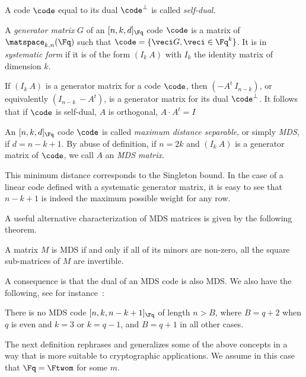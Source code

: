 A code $\code$ equal to its dual $\code^\bot$ is called \emph{self-dual}.


\begin{defi}
A \emph{generator matrix} $G$ of an $[n, k, d]_{\Fq}$ code $\code$ is a matrix of $\matspace_{k,n}(\Fq)$ such that
$\code = \{\veci G, \veci \in \Fq^k\}$. It is in \emph{systematic form} if it is of the form $(I_k~A)$ with
$I_k$ the identity matrix of dimension $k$.
\end{defi}

If $(I_k~A)$ is a generator matrix for a code $\code$, then $(-A^t~I_{n-k})$, or equivalently $(I_{n-k}~-A^t)$,
is a generator matrix for its dual $\code^\bot$. It follows that if $\code$ is self-dual, $A$ is orthogonal,
\ie $A\cdot A^t = I$

\begin{defi}
An $[n,k,d]_{\Fq}$ code $\code$ is called \emph{maximum distance separable}, or simply \emph{MDS}, if $d = n - k + 1$.
By abuse of definition, if $n = 2k$ and $(I_k~A)$ is a generator matrix of $\code$, we call $A$ an \emph{MDS matrix}.
\end{defi}

This minimum distance corresponds to the Singleton bound. In the case of a linear code 
defined with a
systematic generator matrix, it is easy to see that $n - k + 1$ is indeed the maximum possible weight for any row.

A useful alternative characterization of MDS matrices is given by the following theorem.

\begin{thm} 
\label{thm:mds_minors}
A matrix $M$ is MDS if and only if all of its minors are non-zero, \ie all the square sub-matrices of $M$ are invertible.
\end{thm}

A consequence is that the dual of an MDS code is also MDS.
We also have the following, see for instance~\cite[Chap. 1]{tvn}:

\begin{conj}
There is no MDS code $[n,k,n-k+1]_{\Fq}$ of length $n > B$,
where $B = q + 2$ when $q$ is even and $k = 3$ or $k = q - 1$,
and $B = q + 1$ in all other cases. 
\end{conj}

The next definition rephrases and generalizes some of the above concepts in a way that is more suitable to cryptographic applications.
We assume in this case that $\Fq = \Ftwom$ for some $m$.

